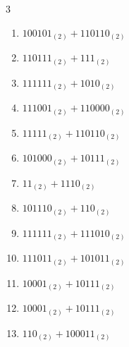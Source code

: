 \begin{multicols}{3}
\begin{enumerate}
\columnbreak %

\resetques

  \item $100101_{(2)} + 110110_{(2)}$


  \item $110111_{(2)} + 111_{(2)}$


  \item $111111_{(2)} + 1010_{(2)}$


  \item $111001_{(2)} + 110000_{(2)}$


  \item $11111_{(2)} + 110110_{(2)}$


  \item $101000_{(2)} + 10111_{(2)}$


  \item $11_{(2)} + 1110_{(2)}$


  \item $101110_{(2)} + 110_{(2)}$


  \item $111111_{(2)} + 111010_{(2)}$


  \item $111011_{(2)} + 101011_{(2)}$


\columnbreak %

  \item $10001_{(2)} + 10111_{(2)}$


  \item $10001_{(2)} + 10111_{(2)}$


  \item $110_{(2)} + 100011_{(2)}$


\end{enumerate}
\end{multicols}
